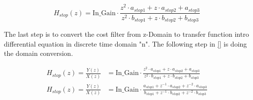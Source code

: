 \begin{equation}\label{eq:bandstop_filter_peak_att}
        H_{stop}(z) =  \text{In_Gain} \cdot \frac{z^2 \cdot a_{stop1} + z \cdot a_{stop2} + a_{stop3}}{z^2 \cdot b_{stop1} + z \cdot b_{stop2} + b_{stop3}}
    \end{equation}
    
    \startexplain
    \stopexplain

The last step is to convert the cost filter from z-Domain to transfer function intro differential equation in discrete time domain "n". The following step in \autoref{} is doing the domain conversion.



\begin{subequations}\label{eq:bandstop_filter_peak_n}
\begin{alignat}{2}
 H_{stop}(z)=\frac{Y(z)}{X(z)} &=  \text{In_Gain} \cdot \frac{z^2 \cdot a_{stop1} + z \cdot a_{stop2} + a_{stop3}}{z^2 \cdot b_{stop1} + z \cdot b_{stop2} + b_{stop3}} \label{eq:bandstop_filter_peak_n_1}\\
 H_{stop}(z)=\frac{Y(z)}{X(z)} &=  \text{In_Gain} \cdot \frac{a_{stop1} + z^{-1} \cdot a_{stop2} +  z^{-2} \cdot a_{stop3}}{b_{stop1} + z^{-1} \cdot b_{stop2} +  z^{-2} \cdot b_{stop3}}  \label{eq:bandstop_filter_peak_n_2}
\end{alignat}
\end{subequations}



